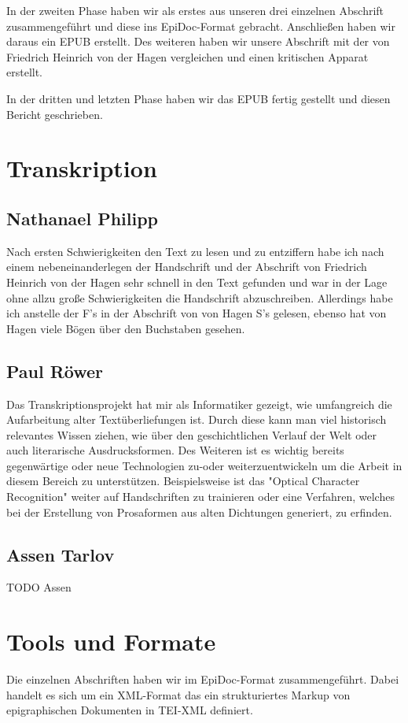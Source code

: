 \documentclass[a4paper, 12pt, oneside]{scrbook}
\begin{document}
In der zweiten Phase haben wir als erstes aus unseren drei einzelnen Abschrift zusammengeführt und diese ins EpiDoc-Format gebracht. Anschließen haben wir daraus ein EPUB erstellt. Des weiteren haben wir unsere Abschrift mit der von Friedrich Heinrich von der Hagen vergleichen und einen kritischen Apparat erstellt.

In der dritten und letzten Phase haben wir das EPUB fertig gestellt und diesen Bericht geschrieben.
\section{Transkription}
\subsection{Nathanael Philipp}
Nach ersten Schwierigkeiten den Text zu lesen und zu entziffern habe ich nach einem nebeneinanderlegen der Handschrift und der Abschrift von Friedrich Heinrich von der Hagen sehr schnell in den Text gefunden und war in der Lage ohne allzu große Schwierigkeiten die Handschrift abzuschreiben. Allerdings habe ich anstelle der F's in der Abschrift von von Hagen S's gelesen, ebenso hat von Hagen viele Bögen über den Buchstaben gesehen.

\subsection{Paul Röwer}
Das Transkriptionsprojekt hat mir als Informatiker gezeigt, wie umfangreich die Aufarbeitung alter Textüberliefungen ist. Durch diese kann man viel historisch relevantes Wissen ziehen, wie über den geschichtlichen Verlauf der Welt oder auch literarische Ausdrucksformen. Des Weiteren ist es wichtig bereits gegenwärtige oder neue Technologien  zu-oder weiterzuentwickeln um die Arbeit in diesem Bereich zu unterstützen. Beispielsweise ist das "Optical Character Recognition" weiter auf Handschriften zu trainieren oder eine Verfahren, welches bei der Erstellung von Prosaformen aus alten Dichtungen generiert, zu erfinden.

\subsection{Assen Tarlov}
TODO Assen
\section{Tools und Formate}
Die einzelnen Abschriften haben wir im EpiDoc-Format zusammengeführt. Dabei handelt es sich um ein XML-Format das ein strukturiertes Markup von epigraphischen Dokumenten in TEI-XML definiert.
\end{document}
